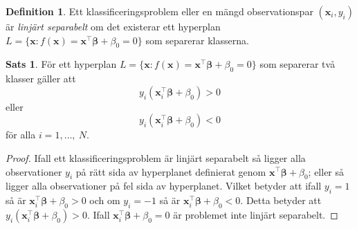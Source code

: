 \documentclass[a4paper, 12pt]{report}
\theoremstyle{definition}
\newtheorem{thm}{Sats}[section]
\newtheorem{defi}{Definition}[section]
\theoremstyle{remark}
\newcommand{\bfbeta}{{\boldsymbol{\beta}}}
\newcommand{\sephyp}{\{ \mathbf{x} : f(\mathbf{x})=\mathbf{x}^\intercal \bfbeta + \beta_0=0\}}
\begin{document}
\begin{defi}
	Ett klassificeringsproblem eller en mängd observationspar $\left(\mathbf{x}_i, y_i\right)$ är \textit{linjärt separabelt} om det existerar ett hyperplan $L=\sephyp$ som separerar klasserna.
\end{defi}

\begin{thm} \cite{Boyd}
	För ett hyperplan $L=\sephyp$ som separerar två klasser gäller att
	\begin{equation*}
		y_i(\mathbf{x}_i^\intercal \bfbeta + \beta_0) > 0
	\end{equation*}
	eller
	\begin{equation*}
		y_i(\mathbf{x}_i^\intercal \bfbeta + \beta_0) < 0
	\end{equation*}
	för alla $i = 1, \dots,~N$.
\end{thm}
\begin{proof}
	Ifall ett klassificeringsproblem är linjärt separabelt så ligger alla observationer $y_i$ på rätt sida av hyperplanet definierat genom $\mathbf{x}^\intercal \bfbeta + \beta_0$; eller så ligger alla observationer på fel sida av hyperplanet. Vilket betyder att ifall $y_i=1$ så är $\mathbf{x}_i^\intercal \bfbeta + \beta_0 > 0$ och om $y_i=-1$ så är $\mathbf{x}_i^\intercal \bfbeta + \beta_0 < 0$. Detta betyder att $y_i(\mathbf{x}_i^\intercal \bfbeta + \beta_0) > 0$. Ifall $\mathbf{x}_i^\intercal \bfbeta + \beta_0 = 0$ är problemet inte linjärt separabelt.
\end{proof}
\end{document}
